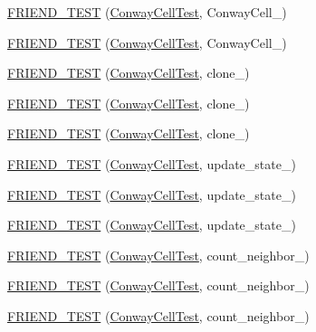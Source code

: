 \begin{DoxyCompactItemize}
\item 
\hyperlink{classConwayCell_aa53ff60436e507934569ad56ef9173e3}{F\-R\-I\-E\-N\-D\-\_\-\-T\-E\-S\-T} (\hyperlink{classConwayCell_aaf9203db9ae10bf69d131c17aa7bf43c}{Conway\-Cell\-Test}, Conway\-Cell\-\_)
\item 
\hyperlink{classConwayCell_ad6c71e5f6e6d522ceac4238841840f19}{F\-R\-I\-E\-N\-D\-\_\-\-T\-E\-S\-T} (\hyperlink{classConwayCell_aaf9203db9ae10bf69d131c17aa7bf43c}{Conway\-Cell\-Test}, Conway\-Cell\-\_)
\item 
\hyperlink{classConwayCell_a69db8d9316954fdf1743c6a71bc982c4}{F\-R\-I\-E\-N\-D\-\_\-\-T\-E\-S\-T} (\hyperlink{classConwayCell_aaf9203db9ae10bf69d131c17aa7bf43c}{Conway\-Cell\-Test}, clone\-\_)
\item 
\hyperlink{classConwayCell_a3ab2d2c90bb57a8b50442b6100f0308c}{F\-R\-I\-E\-N\-D\-\_\-\-T\-E\-S\-T} (\hyperlink{classConwayCell_aaf9203db9ae10bf69d131c17aa7bf43c}{Conway\-Cell\-Test}, clone\-\_)
\item 
\hyperlink{classConwayCell_aee7a7ab257ea971be8d495686919e571}{F\-R\-I\-E\-N\-D\-\_\-\-T\-E\-S\-T} (\hyperlink{classConwayCell_aaf9203db9ae10bf69d131c17aa7bf43c}{Conway\-Cell\-Test}, clone\-\_)
\item 
\hyperlink{classConwayCell_ab8149e7169ca80bc99322e205fdc32d8}{F\-R\-I\-E\-N\-D\-\_\-\-T\-E\-S\-T} (\hyperlink{classConwayCell_aaf9203db9ae10bf69d131c17aa7bf43c}{Conway\-Cell\-Test}, update\-\_\-state\-\_)
\item 
\hyperlink{classConwayCell_a69cf21e56a52a165b356afeaab25ed04}{F\-R\-I\-E\-N\-D\-\_\-\-T\-E\-S\-T} (\hyperlink{classConwayCell_aaf9203db9ae10bf69d131c17aa7bf43c}{Conway\-Cell\-Test}, update\-\_\-state\-\_)
\item 
\hyperlink{classConwayCell_a99bd220d17a2e3690de9cf5e089f35cc}{F\-R\-I\-E\-N\-D\-\_\-\-T\-E\-S\-T} (\hyperlink{classConwayCell_aaf9203db9ae10bf69d131c17aa7bf43c}{Conway\-Cell\-Test}, update\-\_\-state\-\_)
\item 
\hyperlink{classConwayCell_a0cc28543775075f67a5fde349eccfcbe}{F\-R\-I\-E\-N\-D\-\_\-\-T\-E\-S\-T} (\hyperlink{classConwayCell_aaf9203db9ae10bf69d131c17aa7bf43c}{Conway\-Cell\-Test}, count\-\_\-neighbor\-\_)
\item 
\hyperlink{classConwayCell_af0c4905fac30c9919443297577ad7596}{F\-R\-I\-E\-N\-D\-\_\-\-T\-E\-S\-T} (\hyperlink{classConwayCell_aaf9203db9ae10bf69d131c17aa7bf43c}{Conway\-Cell\-Test}, count\-\_\-neighbor\-\_)
\item 
\hyperlink{classConwayCell_a5d773d33e9e45dec53ff3e2695cfa2d1}{F\-R\-I\-E\-N\-D\-\_\-\-T\-E\-S\-T} (\hyperlink{classConwayCell_aaf9203db9ae10bf69d131c17aa7bf43c}{Conway\-Cell\-Test}, count\-\_\-neighbor\-\_)

\end{DoxyCompactItemize}
